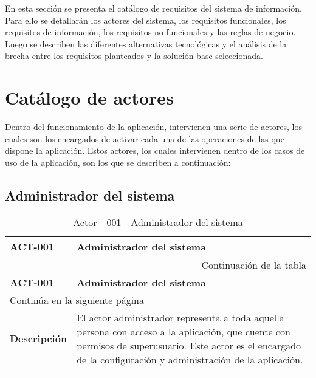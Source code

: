 

En esta sección se presenta el catálogo de requisitos del sistema de
información. Para ello se detallarán los actores del sistema, los requisitos
funcionales, los requisitos de información, los requisitos no funcionales y las
reglas de negocio. Luego se describen las diferentes alternativas tecnológicas y
el análisis de la brecha entre los requisitos planteados y la solución base
seleccionada.

\section{Catálogo de actores}

Dentro del funcionamiento de la aplicación, intervienen una serie de actores,
los cuales son los encargados de activar cada una de las operaciones de las que
dispone la aplicación. Estos actores, los cuales intervienen dentro de los casos
de uso de la aplicación, son los que se describen a continuación:

\subsection{Administrador del sistema}

\begin{center}
\begin{longtable}{||p{3.4cm}|p{12cm}||}
 \hline \hline \bf ACT-001 &  \bf Administrador del sistema \\
\hline
\endfirsthead
\hline \multicolumn{2}{|r|}{{Continuación de la tabla}} \\ \hline
 \hline \bf ACT-001 &  \bf Administrador del sistema \\
\hline
\endhead
\hline \multicolumn{2}{|l|}{{Continúa en la siguiente página}} \\ \hline
\endfoot
\endlastfoot
 \hline \bf Descripción & El actor administrador representa a toda
             aquella persona con acceso a la aplicación, que cuente con permisos
             de superusuario. Este actor es el encargado de la configuración y
             administración de la aplicación.\\
\hline
\hline
\caption{\label{tab:act001} Actor - 001 - Administrador del sistema} 
\end{longtable}
\end{center}


